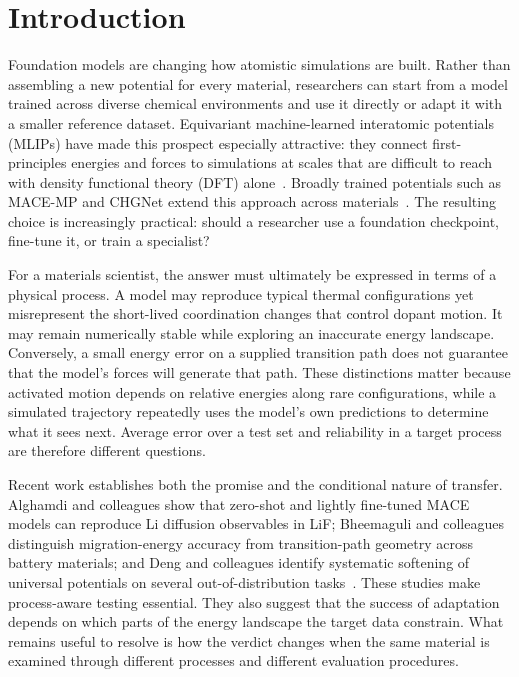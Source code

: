 \documentclass[pdflatex,sn-mathphys-num]{sn-jnl}
\newif\ifreviewcopy
\newcommand{\rev}[2]{\ifreviewcopy{\color{revisionblue}#2\textsuperscript{\scriptsize[R1-#1]}}\else#2\fi}
\begin{document}
\section{Introduction}\label{sec:introduction}
Foundation models are changing how atomistic simulations are built. Rather than assembling a new potential for every material, researchers can start from a model trained across diverse chemical environments and use it directly or adapt it with a smaller reference dataset. Equivariant machine-learned interatomic potentials (MLIPs) have made this prospect especially attractive: they connect first-principles energies and forces to simulations at scales that are difficult to reach with density functional theory (DFT) alone~\citep{unke_machine_2021,batzner_e3-equivariant_2022,batatia_mace_nodate}. Broadly trained potentials such as MACE-MP and CHGNet extend this approach across materials~\citep{batatia_mace_foundation_2025,deng_chgnet_2023}. The resulting choice is increasingly practical: should a researcher use a foundation checkpoint, fine-tune it, or train a specialist?

For a materials scientist, the answer must ultimately be expressed in terms of a physical process. A model may reproduce typical thermal configurations yet misrepresent the short-lived coordination changes that control dopant motion. It may remain numerically stable while exploring an inaccurate energy landscape. Conversely, a small energy error on a supplied transition path does not guarantee that the model's forces will generate that path. These distinctions matter because activated motion depends on relative energies along rare configurations, while a simulated trajectory repeatedly uses the model's own predictions to determine what it sees next. Average error over a test set and reliability in a target process are therefore different questions.

Recent work establishes both the promise and the conditional nature of transfer. \rev{A7}{Alghamdi and colleagues show that zero-shot and lightly fine-tuned MACE models can reproduce Li diffusion observables in LiF; Bheemaguli and colleagues distinguish migration-energy accuracy from transition-path geometry across battery materials; and Deng and colleagues identify systematic softening of universal potentials on several out-of-distribution tasks~\citep{alghamdi2025maceLiF,bheemaguli2026mlipBarriers,deng2025softening}.} These studies make process-aware testing essential. They also suggest that the success of adaptation depends on which parts of the energy landscape the target data constrain. What remains useful to resolve is how the verdict changes when the same material is examined through different processes and different evaluation procedures.
\end{document}
